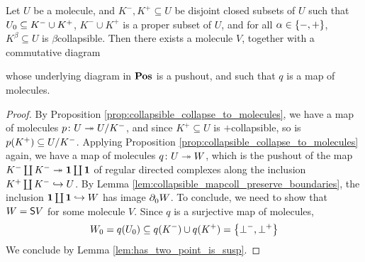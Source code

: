 \begin{prop} \label{prop:desuspension}
    Let \( U \) be a molecule, and \( K^-, K^+ \subseteq U \) be disjoint closed subsets of \( U \) such that \( \gr{0}{U} \subseteq K^- \cup K^+ \), \( K^- \cup K^+ \) is a proper subset of \( U \), and for all \( \a \in \set{-, +} \), \( K^\beta \subseteq U \) is \( \beta \)\nbd collapsible.
    Then there exists a molecule \( V \), together with a commutative diagram
    \begin{center}
    \end{center}
    whose underlying diagram in \( \Pos \) is a pushout, and such that \( q \) is a map of molecules.
\end{prop}
\begin{proof}
    By Proposition \ref{prop:collapsible_collapse_to_molecules}, we have a map of molecules \( p \colon U \surj \coll{K^-}{U} \), and since \( K^+ \subseteq U \) is \( + \)\nbd collapsible, so is \( p(K^+) \subseteq \coll{K^-}{U} \).
    Applying Proposition \ref{prop:collapsible_collapse_to_molecules} again, we have a map of molecules \( q \colon U \surj W \), which is the pushout of the map \( K^- \coprod K^- \surj \pt \coprod \pt \) of regular directed complexes along the inclusion \( K^+ \coprod K^- \incl U \).
    By Lemma \ref{lem:collapsible_mapcoll_preserve_boundaries}, the inclusion \( \pt \coprod \pt \incl W \) has image \( \bd{0}{} W \).
    To conclude, we need to show that \( W = \sus{V} \) for some molecule \( V \).
    Since \( q \) is a surjective map of molecules, 
    \begin{equation*}
        \gr{0}{W} = q(\gr{0}{U}) \subseteq q(K^-) \cup q(K^+) = \set{\bot^-, \bot^+}
    \end{equation*}
    We conclude by Lemma \ref{lem:has_two_point_is_susp}.
\end{proof}

